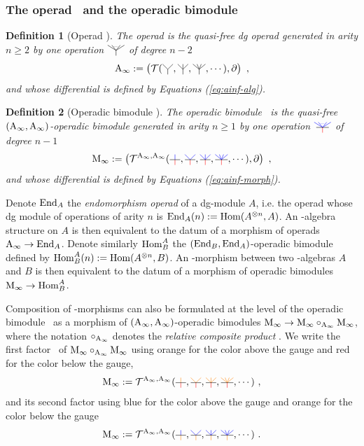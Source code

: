 \documentclass[twoside, 11pt]{amsart}
\newtheorem{definition}{Definition}[section]
\theoremstyle{remark}
\begin{document}
\subsubsection{The operad \Ainf\ and the operadic bimodule \Minf} \label{sss:operad-ainf-operadic-bimod-minf}

\begin{definition}[Operad \Ainf]
The \emph{operad \Ainf} is the quasi-free dg operad generated in arity $n \geq 2$ by one operation $\arbreop{0.15}$ of degree $n-2$ 
\[ \Ainf := \left( \mathcal{T}( \arbreopdeux , \arbreoptrois, \arbreopquatre , \cdots ) , \partial \right) \ , \]
and whose differential is defined by Equations (\ref{eq:ainf-alg}).
\end{definition}

\begin{definition}[Operadic bimodule \Minf]
The operadic bimodule \Minf\ is the quasi-free $(\mathrm{A}_\infty ,\mathrm{A}_\infty )$-operadic bimodule generated in arity $n \geq 1$ by one operation $\arbreopmorph{0.15}$ of degree $n-1$ 
\[ \Minf :=  \left( \mathcal{T}^{\Ainf , \Ainf}(\arbreopunmorph , \arbreopdeuxmorph , \arbreoptroismorph , \arbreopquatremorph , \cdots ) , \partial \right) \ , \]
and whose differential is defined by Equations (\ref{eq:ainf-morph}).
\end{definition}

Denote $\mathrm{End}_A$ the \textit{endomorphism operad} of a dg-module $A$, i.e. the operad whose dg module of operations of arity $n$ is $\mathrm{End}_A(n) := \mathrm{Hom} (A^{\otimes n},A)$. An \Ainf -algebra structure on $A$ is then equivalent to the datum of a morphism of operads $\mathrm{A}_\infty \rightarrow \mathrm{End}_A$. Denote similarly $\mathrm{Hom}^A_B$ the $(\mathrm{End}_B , \mathrm{End}_A)$-operadic bimodule defined by $ \mathrm{Hom}^A_B(n) := \mathrm{Hom} (A^{\otimes n},B)$. An \Ainf -morphism between two \Ainf -algebras $A$ and $B$ is then equivalent to the datum of a morphism of operadic bimodules $\mathrm{M}_\infty \rightarrow \mathrm{Hom}^A_B$.

Composition of \Ainf -morphisms can also be formulated at the level of the operadic bimodule \Minf\ as a morphism of $(\mathrm{A}_\infty , \mathrm{A}_\infty)$-operadic bimodules $\mathrm{M}_\infty \rightarrow \mathrm{M}_\infty \circ_{\mathrm{A}_\infty} \mathrm{M}_\infty$, where the notation $\circ_{\mathrm{A}_\infty}$ denotes the \emph{relative composite product} \cite[Section 11.2.1]{LodayVallette12}.
We write the first factor \Minf\ of $\mathrm{M}_\infty \circ_{\mathrm{A}_\infty} \mathrm{M}_\infty$ using orange for the color above the gauge and red for the color below the gauge,
\[ \Minf :=  \mathcal{T}^{\Ainf , \Ainf}(\arbreopunmorphcompdeux , \arbreopdeuxmorphcompdeux , \arbreoptroismorphcompdeux , \arbreopquatremorphcompdeux , \cdots ) \ , \]
and its second factor using blue for the color above the gauge and orange for the color below the gauge
\[ \Minf :=  \mathcal{T}^{\Ainf , \Ainf}(\arbreopunmorphcompun , \arbreopdeuxmorphcompun , \arbreoptroismorphcompun , \arbreopquatremorphcompun , \cdots ) \ . \]
\end{document}
